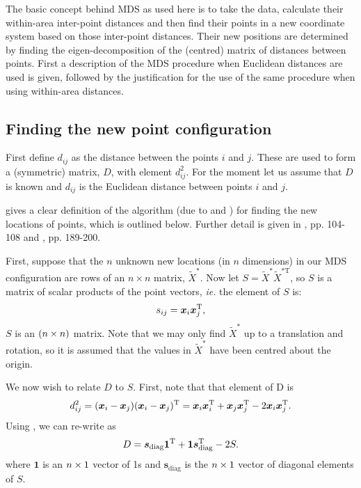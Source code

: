 The basic concept behind MDS as used here is to take the data, calculate their within-area inter-point distances and then find their points in a new coordinate system based on those inter-point distances. Their new positions are determined by finding the eigen-decomposition of the (centred) matrix of distances between points. First a description of the MDS procedure when Euclidean distances are used is given, followed by the justification for the use of the same procedure when using within-area distances. 

\subsection{Finding the new point configuration}

First define $d_{ij}$ as the distance between the points $i$ and $j$. These are used to form a (symmetric) matrix, $D$, with \ijth element $d^2_{ij}$. For the moment let us assume that $D$ is known and $d_{ij}$ is the Euclidean distance between points $i$ and $j$. 

\cite{diaconis08} gives a clear definition of the algorithm (due to \cite{schoenberg35} and \cite{torgerson}) for finding the new locations of points, which is outlined below. Further detail is given in \cite{principlesofMA}, pp. 104-108 and \cite{chatfieldcollins}, pp. 189-200.

First, suppose that the $n$ unknown new locations (in $n$ dimensions) in our MDS configuration are rows of an $n \times n$ matrix, $\tilde{X}^*$. Now let $S=\tilde{X}^{*} \tilde{X}^{*\text{T}} $, so $S$ is a matrix of scalar products of the point vectors, \emph{ie.} the \ijth element of $S$ is:
\begin{equation}
s_{ij} = \bm{x}_i\bm{x}_j^{\text{T}},
\label{selem}
\end{equation}
$S$ is an $(n\times n)$ matrix. Note that we may only find $\tilde{X}^*$ up to a translation and rotation, so it is assumed that the values in $\tilde{X}^*$ have been centred about the origin.

We now wish to relate $D$ to $S$. First, note that that \ijth element of D is 
\begin{equation}
d_{ij}^2 = (\bm{x}_i-\bm{x}_j)(\bm{x}_i-\bm{x}_j)^{\text{T}} = \bm{x}_i\bm{x}_i^{\text{T}} + \bm{x}_j\bm{x}_j^{\text{T}}  -2 \bm{x}_i\bm{x}_j^{\text{T}}.
\label{dij}
\end{equation}
Using , we can re-write  as
\begin{equation}
D=\bm{s}_\text{diag}\bm{1}^{\text{T}} + \bm{1}\bm{s}_\text{diag}^{\text{T}} -2S.
\label{dijmat}
\end{equation}
where $\bm{1}$ is an $n \times 1$ vector of 1s and $\bm{s}_\text{diag}$ is the $n \times 1$ vector of diagonal elements of $S$.

